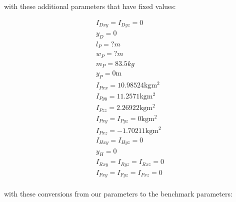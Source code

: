 \documentclass{article}
\begin{document}
with these additional parameters that have fixed values:

\begin{align}
  I_{Dxy} = I_{Dyz} = 0 \\
  y_D = 0 \\
  l_P = ? \si{m}\\
  w_P = ? \si{m} \\
  m_P = 83.5 \si{kg} \\
  y_P = 0 \si{\meter} \\
  I_{Pxx} = 10.98524 \si{\kg\meter^2} \\
  I_{Pyy} = 11.2571 \si{\kg\meter^2}\\
  I_{Pzz} = 2.26922 \si{\kg\meter^2}\\
  I_{Pxy} = I_{Pyz} = 0 \si{\kg\meter^2}\\
  I_{Pxz} = -1.70211 \si{\kg\meter^2}\\
  I_{Hxy} = I_{Hyz} = 0 \\
  y_H = 0 \\
  I_{Rxy} = I_{Ryz} = I_{Rxz} = 0 \\
  I_{Fxy} = I_{Fyz} = I_{Fxz} = 0 \\
\end{align}

with these conversions from our parameters to the benchmark parameters:
\end{document}
